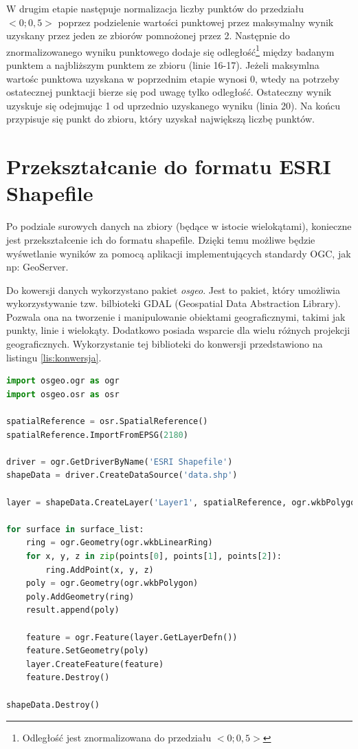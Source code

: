 W drugim etapie następuje normalizacja liczby punktów do przedziału $<0; 0,5>$ poprzez podzielenie wartości punktowej
przez maksymalny wynik uzyskany przez jeden ze zbiorów pomnożonej przez 2. Następnie do znormalizowanego wyniku punktowego
dodaje się odległość\footnote{Odległość jest znormalizowana do przedziału $<0; 0,5>$} 
między badanym punktem a najbliższym punktem ze zbioru (linie 16-17).
Jeżeli maksymlna wartośc punktowa uzyskana w poprzednim etapie wynosi 0, wtedy na potrzeby ostatecznej punktacji
bierze się pod uwagę tylko odległość. Ostateczny wynik uzyskuje się odejmując 1 od uprzednio uzyskanego wyniku (linia 20).
Na końcu przypisuje się punkt do zbioru, który uzyskał największą liczbę punktów.

\section{Przekształcanie do formatu ESRI Shapefile}

Po podziale surowych danych na zbiory (będące w istocie wielokątami), konieczne jest
przekształcenie ich do formatu shapefile. Dzięki temu możliwe będzie wyśwetlanie wyników
za pomocą aplikacji implementujących standardy OGC, jak np: GeoServer.

Do kowersji danych wykorzystano pakiet \textit{osgeo}. Jest to pakiet, który umożliwia
wykorzystywanie tzw. bilbioteki GDAL (Geospatial Data Abstraction Library). Pozwala ona
na tworzenie i manipulowanie obiektami geograficznymi, takimi jak punkty, linie i wielokąty.
Dodatkowo posiada wsparcie dla wielu różnych projekcji geograficznych. Wykorzystanie tej
biblioteki do konwersji przedstawiono na listingu \ref{lis:konwersja}.

\begin{lstlisting}[frame=L, language=python, caption={Konwersja danych do formatu SHP}, label={lis:konwersja}]
import osgeo.ogr as ogr
import osgeo.osr as osr

spatialReference = osr.SpatialReference()
spatialReference.ImportFromEPSG(2180)

driver = ogr.GetDriverByName('ESRI Shapefile')
shapeData = driver.CreateDataSource('data.shp')

layer = shapeData.CreateLayer('Layer1', spatialReference, ogr.wkbPolygon)

for surface in surface_list:
	ring = ogr.Geometry(ogr.wkbLinearRing)
	for x, y, z in zip(points[0], points[1], points[2]):
	    ring.AddPoint(x, y, z)
	poly = ogr.Geometry(ogr.wkbPolygon)
	poly.AddGeometry(ring)
	result.append(poly)
	
	feature = ogr.Feature(layer.GetLayerDefn())
	feature.SetGeometry(poly)
	layer.CreateFeature(feature)
	feature.Destroy()

shapeData.Destroy()

\end{lstlisting}


